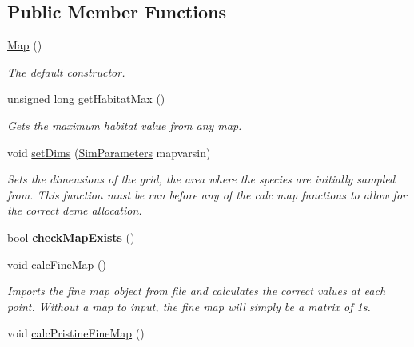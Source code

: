 \subsection*{Public Member Functions}
\begin{DoxyCompactItemize}
\item 
\hyperlink{class_map_a0f5ad0fd4563497b4214038cbca8b582}{Map} ()\hypertarget{class_map_a0f5ad0fd4563497b4214038cbca8b582}{}\label{class_map_a0f5ad0fd4563497b4214038cbca8b582}

\begin{DoxyCompactList}\small\item\em The default constructor. \end{DoxyCompactList}\item 
unsigned long \hyperlink{class_map_a28f72a430bee372e855139adff0bc597}{get\+Habitat\+Max} ()
\begin{DoxyCompactList}\small\item\em Gets the maximum habitat value from any map. \end{DoxyCompactList}\item 
void \hyperlink{class_map_a4265717341e63a4662bf7ada49cc0c3d}{set\+Dims} (\hyperlink{struct_sim_parameters}{Sim\+Parameters} mapvarsin)
\begin{DoxyCompactList}\small\item\em Sets the dimensions of the grid, the area where the species are initially sampled from. This function must be run before any of the calc map functions to allow for the correct deme allocation. \end{DoxyCompactList}\item 
bool {\bfseries check\+Map\+Exists} ()\hypertarget{class_map_ab74d57e0de40b6e16c7bb62489ecff5c}{}\label{class_map_ab74d57e0de40b6e16c7bb62489ecff5c}

\item 
void \hyperlink{class_map_ab3c9e77675ad9ca1d34e9ff8e861901d}{calc\+Fine\+Map} ()\hypertarget{class_map_ab3c9e77675ad9ca1d34e9ff8e861901d}{}\label{class_map_ab3c9e77675ad9ca1d34e9ff8e861901d}

\begin{DoxyCompactList}\small\item\em Imports the fine map object from file and calculates the correct values at each point. Without a map to input, the fine map will simply be a matrix of 1s. \end{DoxyCompactList}\item 
void \hyperlink{class_map_ab1d1bac59d3e1518deaa2ebc561a7f82}{calc\+Pristine\+Fine\+Map} ()\hypertarget{class_map_ab1d1bac59d3e1518deaa2ebc561a7f82}{}\label{class_map_ab1d1bac59d3e1518deaa2ebc561a7f82}


\end{DoxyCompactItemize}
